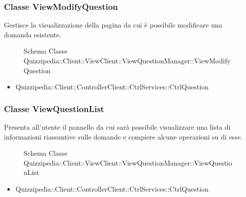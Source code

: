 \subsubsection{Classe ViewModifyQuestion}
Gestisce la visualizzazione della pagina da cui è possibile modificare una domanda esistente.
\begin{figure}[H]
\centering
\noindent{}
\caption{Schema Classe Quizzipedia::Client::ViewClient::ViewQuestionManager::ViewModifyQuestion}
\end{figure}
\begin{itemize}
\item Quizzipedia::Client::ControllerClient::CtrlServices::CtrlQuestion
\end{itemize}
\subsubsection{Classe ViewQuestionList}
Presenta all'utente il pannello da cui sarà possibile visualizzare una lista di informazioni riassuntive sulle domande e compiere alcune operazioni su di esse.
\begin{figure}[H]
\centering
\noindent{}
\caption{Schema Classe Quizzipedia::Client::ViewClient::ViewQuestionManager::ViewQuestionList}
\end{figure}
\begin{itemize}
\item Quizzipedia::Client::ControllerClient::CtrlServices::CtrlQuestion
\end{itemize}
